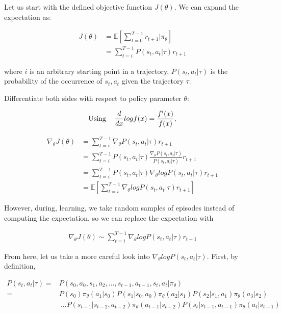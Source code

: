 \documentclass[letterpaper,11pt]{article}
\begin{document}
Let us start with the defined objective function $J(\theta)$. We can expand the expectation as:

$$
\begin{aligned}
J(\theta) &= \mathbb{E}[\sum\limits_{t=0}^{T-1} r_{t+1} | \pi_{\theta}] \\ &= \sum\limits_{t=i}^{T-1}P(s_{t}, a_{t} | \tau) r_{t+1}
\end{aligned}
$$

\noindent where $i$ is an arbitrary starting point in a trajectory, $P(s_{t}, a_{t} | \tau)$ is the probability of the occurrence of $s_{t}, a_{t}$ given the
trajectory $\tau$.
\vspace{0.5cm}

\noindent Differentiate both sides with respect to policy parameter $\theta$:

$$
\text{Using  \hspace{0.3cm}}
\begin{aligned}
    \frac{d}{dx} log f(x) = \frac{f'(x)}{f(x)},
\end{aligned}
$$

$$
\begin{aligned}
    \nabla_{\theta} J(\theta) & = \sum\limits_{t=i}^{T-1} \nabla_{\theta} P(s_{t}, a_{t} | \tau) r_{t+1} \\ 
    & = \sum\limits_{t=i}^{T-1} P(s_{t}, a_{t} | \tau) \frac{\nabla_{\theta} P(s_{t}, a_{t} | \tau)}{P(s_{t}, a_{t} | \tau)} r_{t+1} \\ 
    & = \sum\limits_{t=i}^{T-1} P(s_{t}, a_{t} | \tau) \nabla_{\theta} log P(s_{t}, a_{t} | \tau) r_{t+1} \\ 
    & = \mathbb{E} [\sum\limits_{t=i}^{T-1} \nabla_{\theta} log P(s_{t}, a_{t} | \tau) r_{t+1}]
\end{aligned}
$$

\noindent However, during, learning, we take random samples of episodes instead of computing the expectation, so we can replace the expectation with 

$$
\begin{aligned}
    \nabla_{\theta} J(\theta) \sim \sum\limits_{t=i}^{T-1} \nabla_{\theta} log P(s_{t}, a_{t} | \tau) r_{t+1}
\end{aligned}
$$

From here, let us take a more careful look into $\nabla_{\theta} log P(s_{t}, a_{t} | \tau) $. First, by definition,

$$
\begin{aligned}
    P(s_{t}, a_{t} | \tau) ={}& P(s_{0}, a_{0}, s_{1}, a_{2}, ..., s_{t-1}, a_{t-1}, s_{t}, a_{t} | \pi_{\theta}) \\
                           ={}& P(s_{0}) \pi_{\theta}(a_{1} | s_{0}) P(s_{1} | s_{0}, a_{0}) \pi_{\theta}(a_{2} | s_{1})
 P(s_{2} | s_{1}, a_{1}) \pi_{\theta}(a_{3} | s_{2}) \\ & \ ... P(s_{t-1} | s_{t-2}, a_{t-2}) \pi_{\theta}(a_{t-1} | s_{t-2}) P(s_{t} | s_{t-1}, a_{t-1}) \pi_{\theta}(a_{t} | s_{t-1})
\end{aligned}
$$
\end{document}
